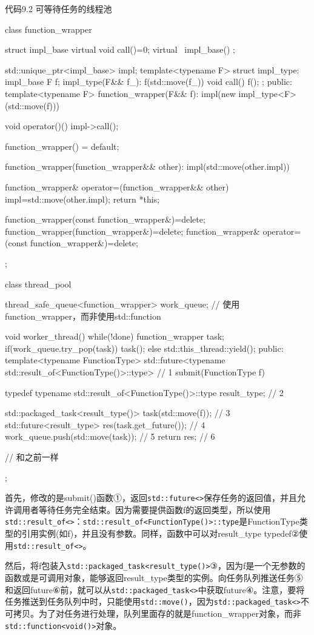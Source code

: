代码9.2 可等待任务的线程池

\begin{cpp}
class function_wrapper
{
  struct impl_base {
    virtual void call()=0;
    virtual ~impl_base() {}
  };

  std::unique_ptr<impl_base> impl;
  template<typename F>
  struct impl_type: impl_base
  {
    F f;
    impl_type(F&& f_): f(std::move(f_)) {}
    void call() { f(); }
  };
public:
  template<typename F>
  function_wrapper(F&& f):
    impl(new impl_type<F>(std::move(f)))
  {}

  void operator()() { impl->call(); }

  function_wrapper() = default;

  function_wrapper(function_wrapper&& other):
    impl(std::move(other.impl))
  {}

  function_wrapper& operator=(function_wrapper&& other)
  {
    impl=std::move(other.impl);
    return *this;
  }

  function_wrapper(const function_wrapper&)=delete;
  function_wrapper(function_wrapper&)=delete;
  function_wrapper& operator=(const function_wrapper&)=delete;
};

class thread_pool
{
  thread_safe_queue<function_wrapper> work_queue;  // 使用function_wrapper，而非使用std::function

  void worker_thread()
  {
    while(!done)
    {
      function_wrapper task;
      if(work_queue.try_pop(task))
      {
        task();
      }
      else
      {
        std::this_thread::yield();
      }
    }
  }
public:
  template<typename FunctionType>
  std::future<typename std::result_of<FunctionType()>::type>  // 1
    submit(FunctionType f)
  {
    typedef typename std::result_of<FunctionType()>::type
      result_type;  // 2

    std::packaged_task<result_type()> task(std::move(f));  // 3
    std::future<result_type> res(task.get_future());  // 4
    work_queue.push(std::move(task));  // 5
    return res;  // 6
  }
  // 和之前一样
};
\end{cpp}

首先，修改的是submit()函数①，返回\texttt{std::future<>}保存任务的返回值，并且允许调用者等待任务完全结束。因为需要提供函数f的返回类型，所以使用\texttt{std::result\_of<>}：\texttt{std::result\_of<FunctionType()>::type}是FunctionType类型的引用实例(如f)，并且没有参数。同样，函数中可以对result\_type typedef②使用\texttt{std::result\_of<>}。

然后，将f包装入\texttt{std::packaged\_task<result\_type()>}③，因为f是一个无参数的函数或是可调用对象，能够返回result\_type类型的实例。向任务队列推送任务⑤和返回future⑥前，就可以从\texttt{std::packaged\_task<>}中获取future④。注意，要将任务推送到任务队列中时，只能使用\texttt{std::move()}，因为\texttt{std::packaged\_task<>}不可拷贝。为了对任务进行处理，队列里面存的就是function\_wrapper对象，而非\texttt{std::function<void()>}对象。

